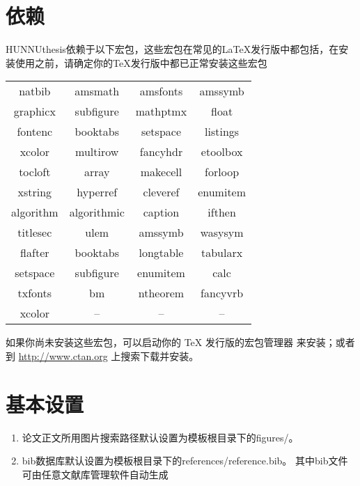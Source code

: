 \section{依赖}
HUNNUthesis依赖于以下宏包，这些宏包在常见的\LaTeX{}发行版中都包括，在安装使用之前，请确定你的\TeX{}发行版中都已正常安装这些宏包
\begin{table}[H]
	\centering
	\begin{tabular}{cccc}
\hline
{natbib} & {amsmath} & {amsfonts} & {amssymb} \\

{graphicx} & {subfigure} & {mathptmx} & {float} \\

{fontenc} & {booktabs} & {setspace} & {listings} \\

{xcolor} & {multirow} & {fancyhdr} & {etoolbox} \\

{tocloft} & {array} & {makecell} & {forloop} \\

{xstring} & {hyperref} & {cleveref} & {enumitem} \\

{algorithm} & {algorithmic} & {caption} & {ifthen} \\

{titlesec} & {ulem} & {amssymb} & {wasysym} \\

{flafter} & {booktabs} & {longtable} & {tabularx} \\

{setspace} & {subfigure} & {enumitem} & {calc } \\

{txfonts} & {bm} & {ntheorem} & {fancyvrb} \\

{xcolor} & {--} & {--} & {--} \\
\hline
	\end{tabular}
\end{table}
如果你尚未安装这些宏包，可以启动你的 \TeX{} 发行版的宏包管理器
来安装；或者到 \url{http://www.ctan.org} 上搜索下载并安装。
\section{基本设置}
\begin{enumerate}
	\item 论文正文所用图片搜索路径默认设置为模板根目录下的figures/。
	\item bib数据库默认设置为模板根目录下的references/reference.bib。 其中bib文件可由任意文献库管理软件自动生成
\end{enumerate}
